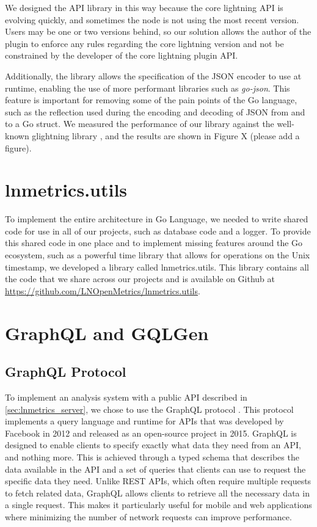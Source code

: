 We designed the API library in this way because the core lightning API is 
evolving quickly, and sometimes the node is not using the most recent version. 
Users may be one or two versions behind, so our solution allows the author of 
the plugin to enforce any rules regarding the core lightning version and not 
be constrained by the developer of the core lightning plugin API.

Additionally, the library allows the specification of the JSON encoder to use 
at runtime, enabling the use of more performant libraries 
such as \emph{go-json}\cite{gojson}. This feature is 
important for removing some of the pain points of the Go language, 
such as the reflection used during the encoding and decoding of JSON from and 
to a Go struct. We measured the performance of our library against the well-known 
glightning library \cite{glightning}, and the results are shown 
in Figure X (please add a figure).

\section{lnmetrics.utils}

To implement the entire architecture in Go Language, we needed to write shared 
code for use in all of our projects, such as database code and a logger. 
To provide this shared code in one place and to implement missing features 
around the Go ecosystem, such as a powerful time library that allows for 
operations on the Unix timestamp, we developed a library called lnmetrics.utils. 
This library contains all the code that we share across our projects and is 
available on Github at \url{https://github.com/LNOpenMetrics/lnmetrics.utils}.

\section{GraphQL and GQLGen}

\subsection{GraphQL Protocol}

To implement an analysis system with a public API described in 
\ref{sec:lnmetrics_server}, we chose to use the GraphQL protocol \cite{graphql}. 
This protocol implements a query language and runtime for APIs that was 
developed by Facebook in 2012 and released as an open-source project in 2015. 
GraphQL is designed to enable clients to specify exactly what data they need 
from an API, and nothing more. This is achieved through a typed schema that 
describes the data available in the API and a set of queries that clients can 
use to request the specific data they need. Unlike REST APIs, which often require 
multiple requests to fetch related data, GraphQL allows clients to retrieve all 
the necessary data in a single request. This makes it particularly useful for 
mobile and web applications where minimizing the number of network 
requests can improve performance.

